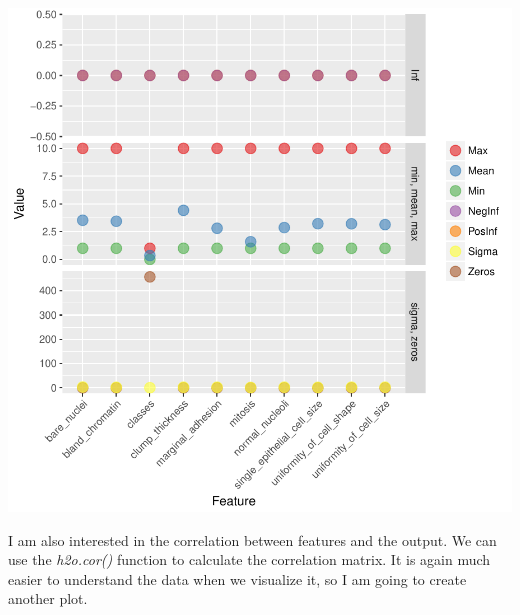 \documentclass[]{article}
\begin{document}
\begin{center}\includegraphics{webinar_code_files/figure-latex/h2o_describe-1} \end{center}

I am also interested in the correlation between features and the output.
We can use the \emph{h2o.cor()} function to calculate the correlation
matrix. It is again much easier to understand the data when we visualize
it, so I am going to create another plot.
\end{document}
